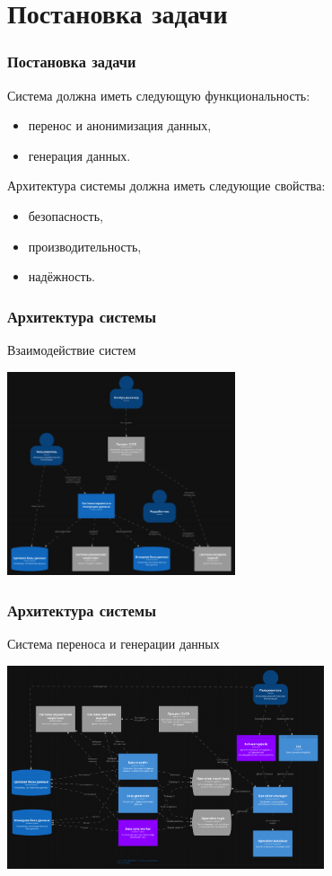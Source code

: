 \documentclass[pdf, hyperref={unicode}, aspectratio=169]{beamer}
\begin{document}
\section{Постановка задачи}
\begin{frame}
	\frametitle{Постановка задачи}
	
	Система должна иметь следующую функциональность:

	\begin{itemize}
		\item перенос и анонимизация данных,
		\item генерация данных.
	\end{itemize}

	Архитектура системы должна иметь следующие свойства:
	
	\begin{itemize}
		\item безопасность,
		\item производительность,
		\item надёжность.
	\end{itemize}
\end{frame}


\begin{frame}
\frametitle{Архитектура системы}
	Взаимодействие систем

	\begin{center}
		\includegraphics[height = 6cm]{img/structurizr-SystemLandspace}
	\end{center}
\end{frame}

\begin{frame}
\frametitle{Архитектура системы}
	Система переноса и генерации данных

	\begin{center}
		\includegraphics[height = 6cm]{img/structurizr-Containers}
	\end{center}
\end{frame}
\end{document}
